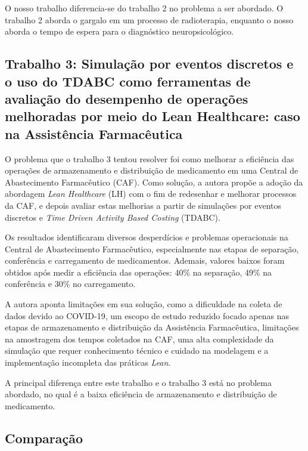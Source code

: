 \documentclass[
    12pt,                %
    openright,           %
    oneside,             %
    a4paper,             %
    english,             %
    brazil               %
]{abntex2}
\begin{document}
O nosso trabalho diferencia-se do trabalho 2 no problema a ser abordado. O trabalho 2 aborda o gargalo em um processo de radioterapia, enquanto o nosso aborda o tempo de espera para o diagnóstico neuropsicológico.

\subsection{Trabalho 3: Simulação por eventos discretos e o uso do TDABC como ferramentas de avaliação do desempenho de operações melhoradas por meio do Lean Healthcare: caso na Assistência Farmacêutica \cite{Bittencourt2022}}

O problema que o trabalho 3 tentou resolver foi como melhorar a eficiência das operações de armazenamento e distribuição de medicamento em uma Central de Abastecimento Farmacêutico (CAF). Como solução, a autora propõe a adoção da abordagem \textit{Lean Healthcare} (LH) com o fim de redesenhar e melhorar processos da CAF, e depois avaliar estas melhorias a partir de simulações por eventos discretos e \textit{Time Driven Activity Based Costing} (TDABC).

Os resultados identificaram diversos desperdícios e problemas operacionais na Central de Abastecimento Farmacêutico, especialmente nas etapas de separação, conferência e carregamento de medicamentos. Ademais, valores baixos foram obtidos após medir a eficiência das operações: 40\% na separação, 49\% na conferência e 30\% no carregamento.

A autora aponta limitações em sua solução, como a dificuldade na coleta de dados devido ao COVID-19, um escopo de estudo reduzido focado apenas nas etapas de armazenamento e distribuição da Assistência Farmacêutica, limitações na amostragem dos tempos coletados na CAF, uma alta complexidade da simulação que requer conhecimento técnico e cuidado na modelagem e a implementação incompleta das práticas \textit{Lean}.

A principal diferença entre este trabalho e o trabalho 3 está no problema abordado, no qual é a baixa eficiência de armazenamento e distribuição de medicamento.

\subsection{Comparação}

\end{document}

